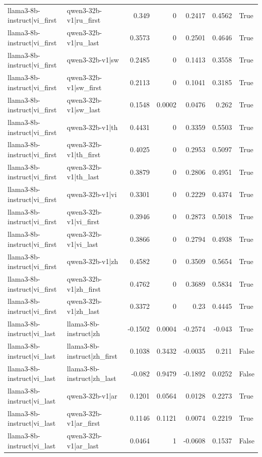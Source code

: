 \begin{table}
\begin{tabular}{l l r r r r l}
llama3-8b-instruct|vi_first & qwen3-32b-v1|ru_first & 0.349 & 0 & 0.2417 & 0.4562 & True \\
llama3-8b-instruct|vi_first & qwen3-32b-v1|ru_last & 0.3573 & 0 & 0.2501 & 0.4646 & True \\
llama3-8b-instruct|vi_first & qwen3-32b-v1|sw & 0.2485 & 0 & 0.1413 & 0.3558 & True \\
llama3-8b-instruct|vi_first & qwen3-32b-v1|sw_first & 0.2113 & 0 & 0.1041 & 0.3185 & True \\
llama3-8b-instruct|vi_first & qwen3-32b-v1|sw_last & 0.1548 & 0.0002 & 0.0476 & 0.262 & True \\
llama3-8b-instruct|vi_first & qwen3-32b-v1|th & 0.4431 & 0 & 0.3359 & 0.5503 & True \\
llama3-8b-instruct|vi_first & qwen3-32b-v1|th_first & 0.4025 & 0 & 0.2953 & 0.5097 & True \\
llama3-8b-instruct|vi_first & qwen3-32b-v1|th_last & 0.3879 & 0 & 0.2806 & 0.4951 & True \\
llama3-8b-instruct|vi_first & qwen3-32b-v1|vi & 0.3301 & 0 & 0.2229 & 0.4374 & True \\
llama3-8b-instruct|vi_first & qwen3-32b-v1|vi_first & 0.3946 & 0 & 0.2873 & 0.5018 & True \\
llama3-8b-instruct|vi_first & qwen3-32b-v1|vi_last & 0.3866 & 0 & 0.2794 & 0.4938 & True \\
llama3-8b-instruct|vi_first & qwen3-32b-v1|zh & 0.4582 & 0 & 0.3509 & 0.5654 & True \\
llama3-8b-instruct|vi_first & qwen3-32b-v1|zh_first & 0.4762 & 0 & 0.3689 & 0.5834 & True \\
llama3-8b-instruct|vi_first & qwen3-32b-v1|zh_last & 0.3372 & 0 & 0.23 & 0.4445 & True \\
llama3-8b-instruct|vi_last & llama3-8b-instruct|zh & -0.1502 & 0.0004 & -0.2574 & -0.043 & True \\
llama3-8b-instruct|vi_last & llama3-8b-instruct|zh_first & 0.1038 & 0.3432 & -0.0035 & 0.211 & False \\
llama3-8b-instruct|vi_last & llama3-8b-instruct|zh_last & -0.082 & 0.9479 & -0.1892 & 0.0252 & False \\
llama3-8b-instruct|vi_last & qwen3-32b-v1|ar & 0.1201 & 0.0564 & 0.0128 & 0.2273 & True \\
llama3-8b-instruct|vi_last & qwen3-32b-v1|ar_first & 0.1146 & 0.1121 & 0.0074 & 0.2219 & True \\
llama3-8b-instruct|vi_last & qwen3-32b-v1|ar_last & 0.0464 & 1 & -0.0608 & 0.1537 & False \\

\end{tabular}
\end{table}
